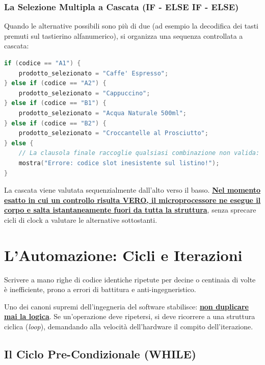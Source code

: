 \subsubsection{La Selezione Multipla a Cascata (IF - ELSE IF - ELSE)}
Quando le alternative possibili sono più di due (ad esempio la decodifica dei tasti premuti sul tastierino alfanumerico), si organizza una sequenza controllata a cascata:

\begin{lstlisting}[language=C++]
if (codice == "A1") {
    prodotto_selezionato = "Caffe' Espresso";
} else if (codice == "A2") {
    prodotto_selezionato = "Cappuccino";
} else if (codice == "B1") {
    prodotto_selezionato = "Acqua Naturale 500ml";
} else if (codice == "B2") {
    prodotto_selezionato = "Croccantelle al Prosciutto";
} else {
    // La clausola finale raccoglie qualsiasi combinazione non valida:
    mostra("Errore: codice slot inesistente sul listino!");
}
\end{lstlisting}
La cascata viene valutata sequenzialmente dall'alto verso il basso. \textbf{\underline{Nel momento esatto in cui un controllo risulta VERO, il microprocessore ne esegue il corpo e salta istantaneamente fuori da tutta la struttura}}, senza sprecare cicli di clock a valutare le alternative sottostanti.

\section{L'Automazione: Cicli e Iterazioni}

Scrivere a mano righe di codice identiche ripetute per decine o centinaia di volte è inefficiente, prono a errori di battitura e anti-ingegneristico.

\begin{concetto}
Uno dei canoni supremi dell'ingegneria del software stabilisce: \textbf{\underline{non duplicare mai la logica}}. Se un'operazione deve ripetersi, si deve ricorrere a una struttura ciclica (\emph{loop}), demandando alla velocità dell'hardware il compito dell'iterazione.
\end{concetto}

\subsection{Il Ciclo Pre-Condizionale (WHILE)}

